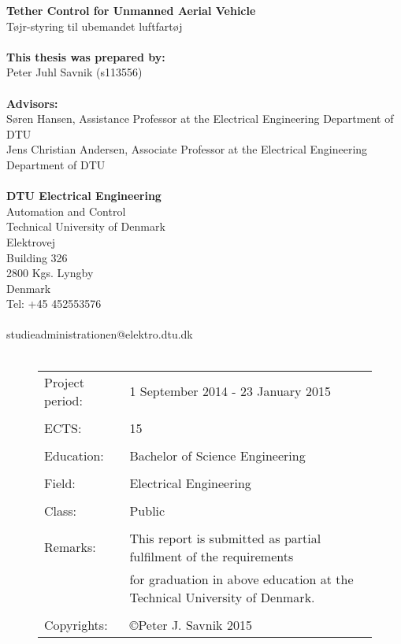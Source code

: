 \noindent
\textbf{Tether Control for Unmanned Aerial Vehicle}\\
Tøjr-styring til ubemandet luftfartøj\\
\\
\textbf{This thesis was prepared by:}\\
Peter Juhl Savnik (s113556)\\
\\
\textbf{Advisors:}\\
Søren Hansen, Assistance Professor at the Electrical Engineering Department of DTU\\
Jens Christian Andersen, Associate Professor at the Electrical Engineering Department of DTU\\
\\
\textbf{DTU Electrical Engineering} \\
Automation and Control\\
Technical University of Denmark\\
Elektrovej\\
Building 326\\
2800 Kgs. Lyngby\\
Denmark\\
Tel: +45 452553576\\
\\
studieadministrationen@elektro.dtu.dk\\
\\
\begin{figure}[b]
\begin{tabular}{ll}
Project period: & 1 September 2014 - 23 January 2015\\
 & \\
ECTS: & 15\\
 & \\
Education: & Bachelor of Science Engineering\\
 & \\
Field: & Electrical Engineering\\
 & \\
Class: & Public\\
 & \\
Remarks: & This report is submitted as partial fulfilment of the requirements\\
 & for graduation in above education at the Technical University of Denmark.\\
 & \\
Copyrights: & \copyright Peter J. Savnik 2015
\end{tabular}
\end{figure}

